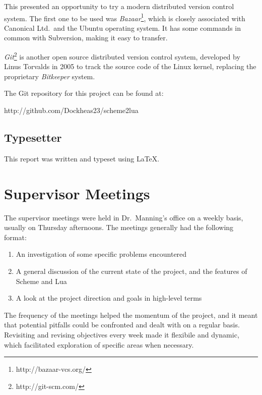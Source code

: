 This presented an opportunity to try a modern distributed version control
system. The first one to be used was
\emph{Bazaar}\footnote{http://bazaar-vcs.org/}, which is closely associated with
Canonical Ltd.\ and the Ubuntu operating system. It has some commands in common
with Subversion, making it easy to transfer.

\emph{Git}\footnote{http://git-scm.com/} is another open source distributed
version control system, developed by Linus Torvalds in 2005 to track the source
code of the Linux kernel, replacing the proprietary \emph{Bitkeeper} system.

The Git repository for this project can be found at:
\begin{center}http://github.com/Dockheas23/scheme2lua\end{center}

\subsection{Typesetter}

This report was written and typeset using \LaTeX.


\section{Supervisor Meetings}

The supervisor meetings were held in Dr.\ Manning's office on a weekly basis,
usually on Thursday afternoons. The meetings generally had the following format:

\begin{enumerate}
\item An investigation of some specific problems encountered
\item A general discussion of the current state of the project, and the
features of Scheme and Lua
\item A look at the project direction and goals in high-level terms
\end{enumerate}

The frequency of the meetings helped the momentum of the project, and it meant
that potential pitfalls could be confronted and dealt with on a regular basis.
Revisiting and revising objectives every week made it flexibile and dynamic,
which facilitated exploration of specific areas when necessary.

